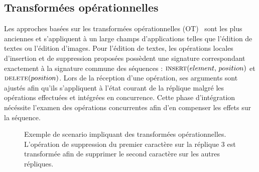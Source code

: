 

\subsection{Transformées opérationnelles}
\label{repl:subsec:ot}

Les approches basées sur les transformées opérationnelles
(OT)~\cite{sun1998operational, sun2009contextbased} sont les plus anciennes et
s'appliquent à un large champs d'applications telles que l'édition de textes ou
l'édition d'images. Pour l'édition de textes, les opérations locales d'insertion
et de suppression proposées possèdent une signature correspondant exactement à
la signature commune des séquences : $\textsc{insert}(element,\, position)$ et
$\textsc{delete}(position)$. Lors de la réception d'une opération, ses arguments
sont ajustés afin qu'ils s'appliquent à l'état courant de la réplique malgré les
opérations effectuées et intégrées en concurrence. Cette phase d'intégration
nécéssite l'examen des opérations concurrentes afin d'en compenser les effets
sur la séquence.


\begin{figure}
  \centering
  
  \caption[Exemple de transformées opérationnelles] {\label{repl:fig:otexample}
    Exemple de scenario impliquant des transformées opérationnelles. L'opération
    de suppression du premier caractère sur la réplique 3 est transformée afin
    de supprimer le second caractère sur les autres répliques.}
\end{figure}


